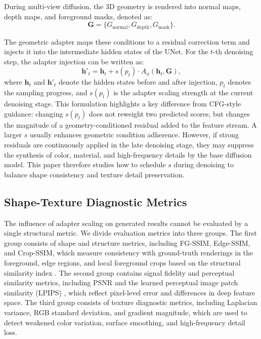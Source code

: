 \documentclass[times,twocolumn,final]{elsarticle}
\providecommand{\DIFadd}[1]{{\protect\color{blue} \sf #1}} %
\providecommand{\DIFaddbegin}{} %
\providecommand{\DIFaddend}{} %
\newcommand{\DIFaddincludegraphics}[2][]{{\color{blue}\fbox{\DIFOincludegraphics[#1]{#2}}}} %
\DeclareRobustCommand{\DIFaddbegin}{\DIFOaddbegin \let\includegraphics\DIFaddincludegraphics} %
\DeclareRobustCommand{\DIFaddend}{\DIFOaddend \let\includegraphics\DIFOincludegraphics} %
\begin{document}
During multi-view diffusion, the 3D geometry is rendered into normal maps, depth maps, and foreground masks, denoted as:
\begin{equation}
\mathbf{G} = \{G_\text{normal}, G_\text{depth}, G_\text{mask}\}.
\end{equation}

The geometric adapter maps these conditions to a residual correction term and injects it into the intermediate hidden states of the UNet. For the $t$-th denoising step, the adapter injection can be written as:
\begin{equation}
\mathbf{h}'_t = \mathbf{h}_t + s(p_t) \cdot A_\phi(\mathbf{h}_t, \mathbf{G}),
\label{eq:injection}
\end{equation}
where $\mathbf{h}_t$ and $\mathbf{h}'_t$ denote the hidden states before and after injection, $p_t$ denotes the sampling progress, and $s(p_t)$ is the adapter scaling strength at the current denoising stage. This formulation highlights a key difference from CFG-style guidance: changing $s(p_t)$ does not reweight two predicted scores, but changes the magnitude of a geometry-conditioned residual added to the feature stream. A larger $s$ usually enhances geometric condition adherence. However, if strong residuals are continuously applied in the late denoising stage, they may suppress the synthesis of color, material, and high-frequency details by the base diffusion model. This paper therefore studies how to schedule $s$ during denoising to balance shape consistency and texture detail preservation.

\subsection{Shape-Texture Diagnostic Metrics}
\label{subsec:metrics}

The influence of adapter scaling on generated results cannot be evaluated by a single structural metric. We divide evaluation metrics into three groups. The first group consists of shape and structure metrics, including FG-SSIM, Edge-SSIM, and Crop-SSIM, which measure consistency with ground-truth renderings in the foreground, edge regions, and local foreground crops \DIFaddbegin \DIFadd{based on the structural similarity index \cite{wang2004ssim}}\DIFaddend . The second group contains signal fidelity and perceptual similarity metrics, including PSNR and   \DIFaddbegin \DIFadd{the learned perceptual image patch similarity (LPIPS) \cite{zhang2018lpips}}\DIFaddend , which reflect pixel-level error and differences in deep feature space. The third group consists of texture diagnostic metrics, including Laplacian variance, RGB standard deviation, and gradient magnitude, which are used to detect weakened color variation, surface smoothing, and high-frequency detail loss.
\end{document}
